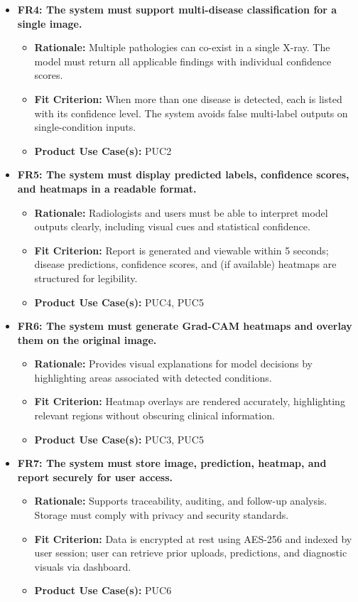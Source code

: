 \documentclass[12pt]{article}
\begin{document}
\begin{itemize}
    \item \textbf{FR4: The system must support multi-disease classification for a single image.}
    \begin{itemize}
        \item \textbf{Rationale:} Multiple pathologies can co-exist in a single X-ray. The model must return all applicable findings with individual confidence scores.
        \item \textbf{Fit Criterion:} When more than one disease is detected, each is listed with its confidence level. The system avoids false multi-label outputs on single-condition inputs.
        \item \textbf{Product Use Case(s):} PUC2
    \end{itemize}

    \item \textbf{FR5: The system must display predicted labels, confidence scores, and heatmaps in a readable format.}
    \begin{itemize}
        \item \textbf{Rationale:} Radiologists and users must be able to interpret model outputs clearly, including visual cues and statistical confidence.
        \item \textbf{Fit Criterion:} Report is generated and viewable within 5 seconds; disease predictions, confidence scores, and (if available) heatmaps are structured for legibility.
        \item \textbf{Product Use Case(s):} PUC4, PUC5
    \end{itemize}

    \item \textbf{FR6: The system must generate Grad-CAM heatmaps and overlay them on the original image.}
    \begin{itemize}
        \item \textbf{Rationale:} Provides visual explanations for model decisions by highlighting areas associated with detected conditions.
        \item \textbf{Fit Criterion:} Heatmap overlays are rendered accurately, highlighting relevant regions without obscuring clinical information.
        \item \textbf{Product Use Case(s):} PUC3, PUC5
    \end{itemize}

    \item \textbf{FR7: The system must store image, prediction, heatmap, and report securely for user access.}
    \begin{itemize}
        \item \textbf{Rationale:} Supports traceability, auditing, and follow-up analysis. Storage must comply with privacy and security standards.
        \item \textbf{Fit Criterion:} Data is encrypted at rest using AES-256 and indexed by user session; user can retrieve prior uploads, predictions, and diagnostic visuals via dashboard.
        \item \textbf{Product Use Case(s):} PUC6
    \end{itemize}


\end{itemize}
\end{document}
